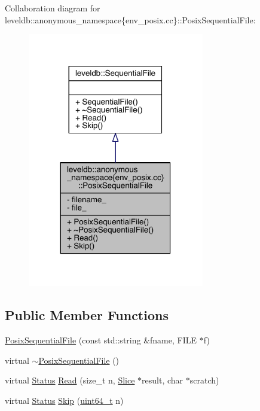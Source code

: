 Collaboration diagram for leveldb\+:\+:anonymous\+\_\+namespace\{env\+\_\+posix.\+cc\}\+:\+:Posix\+Sequential\+File\+:
\nopagebreak
\begin{figure}[H]
\begin{center}
\leavevmode
\includegraphics[width=218pt]{classleveldb_1_1anonymous__namespace_02env__posix_8cc_03_1_1_posix_sequential_file__coll__graph}
\end{center}
\end{figure}
\subsection*{Public Member Functions}
\begin{DoxyCompactItemize}
\item 
\hyperlink{classleveldb_1_1anonymous__namespace_02env__posix_8cc_03_1_1_posix_sequential_file_a339332336a71397a21959886953c6239}{Posix\+Sequential\+File} (const std\+::string \&fname, F\+I\+L\+E $\ast$f)
\item 
virtual \hyperlink{classleveldb_1_1anonymous__namespace_02env__posix_8cc_03_1_1_posix_sequential_file_a9cb02299363227125caec6d69d32935b}{$\sim$\+Posix\+Sequential\+File} ()
\item 
virtual \hyperlink{classleveldb_1_1_status}{Status} \hyperlink{classleveldb_1_1anonymous__namespace_02env__posix_8cc_03_1_1_posix_sequential_file_aeb5eee2a00f5507e2f10f6e51490ff85}{Read} (size\+\_\+t n, \hyperlink{classleveldb_1_1_slice}{Slice} $\ast$result, char $\ast$scratch)
\item 
virtual \hyperlink{classleveldb_1_1_status}{Status} \hyperlink{classleveldb_1_1anonymous__namespace_02env__posix_8cc_03_1_1_posix_sequential_file_a709a8ca449b6c93e851294b5ed93840d}{Skip} (\hyperlink{stdint_8h_aaa5d1cd013383c889537491c3cfd9aad}{uint64\+\_\+t} n)
\end{DoxyCompactItemize}
